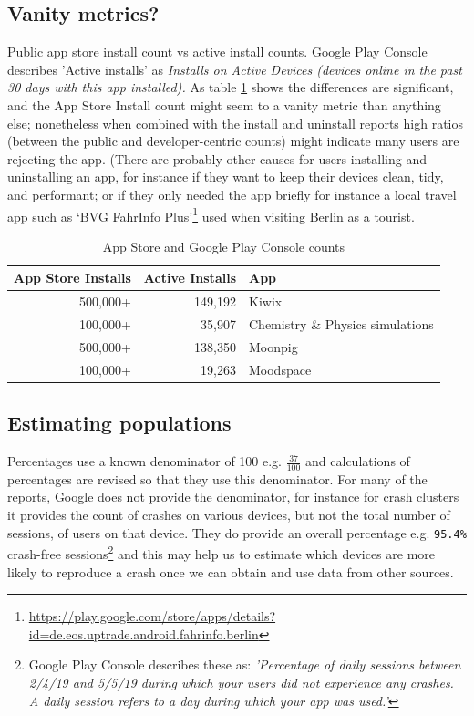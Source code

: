 \subsection{Vanity metrics?}
Public app store install count vs active install counts. Google Play Console describes 'Active installs' as  \textit{Installs on Active Devices (devices online in the past 30 days with this app installed).} As table \ref{tab:app_store_install_counts} shows the differences are significant, and the App Store Install count might seem to a vanity metric than anything else; nonetheless when combined with the install and uninstall reports high ratios (between the public and developer-centric counts) might indicate many users are rejecting the app. (There are probably other causes for users installing and uninstalling an app, for instance if they want to keep their devices clean, tidy, and performant; or if they only needed the app briefly for instance a local travel app such as `BVG FahrInfo Plus'\footnote{\url{ https://play.google.com/store/apps/details?id=de.eos.uptrade.android.fahrinfo.berlin}} used when visiting Berlin as a tourist. 

\begin{table}[]
\begin{tabular}{r|r|l}
\small
App Store Installs &Active Installs &App \\
\hline
500,000+     &149,192  &Kiwix \\
100,000+     &35,907  &Chemistry \& Physics simulations \\
500,000+     &138,350  &Moonpig \\
100,000+     &19,263  &Moodspace
\end{tabular}
\caption{App Store and Google Play Console counts}
\label{tab:app_store_install_counts}

\end{table}

\subsection{Estimating populations}


Percentages use a known denominator of 100 e.g. \( \frac{37}{100} \) and calculations of percentages are revised so that they use this denominator. For many of the reports, Google does not provide the denominator, for instance for crash clusters it provides the count of crashes on various devices, but not the total number of sessions, of users on that device. They do provide an overall percentage e.g. \texttt{95.4\%} crash-free sessions\footnote{Google Play Console describes these as: \textit{'Percentage of daily sessions between 2/4/19 and 5/5/19 during which your users did not experience any crashes. A daily session refers to a day during which your app was used.'}} and this may help us to estimate which devices are more likely to reproduce a crash once we can obtain and use data from other sources.

